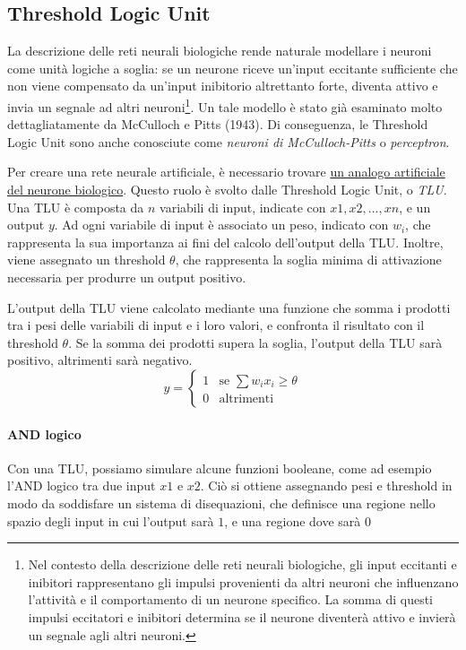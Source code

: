 \subsection{Threshold Logic Unit}
La descrizione delle reti neurali biologiche rende naturale modellare i neuroni come unità logiche a soglia: se un neurone riceve un'input eccitante sufficiente che non viene compensato da un'input inibitorio altrettanto forte, diventa attivo e invia un segnale ad altri neuroni\footnote{Nel contesto della descrizione delle reti neurali biologiche, gli input eccitanti e inibitori rappresentano gli impulsi provenienti da altri neuroni che influenzano l'attività e il comportamento di un neurone specifico. La somma di questi impulsi eccitatori e inibitori determina se il neurone diventerà attivo e invierà un segnale agli altri neuroni.}. Un tale modello è stato già esaminato molto dettagliatamente da McCulloch e Pitts (1943). Di conseguenza, le Threshold Logic Unit sono anche conosciute come \textit{neuroni di McCulloch-Pitts} o \textit{perceptron}.

Per creare una rete neurale artificiale, è necessario trovare \uline{un analogo artificiale del neurone biologico}. Questo ruolo è svolto dalle Threshold Logic Unit, o \textit{TLU}. Una TLU è composta da $n$ variabili di input, indicate con $x1, x2, ..., xn$, e un output $y$. Ad ogni variabile di input è associato un peso, indicato con $w_i$, che rappresenta la sua importanza ai fini del calcolo dell'output della TLU. Inoltre, viene assegnato un threshold $\theta$, che rappresenta la soglia minima di attivazione necessaria per produrre un output positivo.

L'output della TLU viene calcolato mediante una funzione che somma i prodotti tra i pesi delle variabili di input e i loro valori, e confronta il risultato con il threshold $\theta$. Se la somma dei prodotti supera la soglia, l'output della TLU sarà positivo, altrimenti sarà negativo.
$$
y=\begin{cases}
    1 & \text{se } \sum w_ix_i \geq \theta \\
    0 & \text{altrimenti} 
   \end{cases}
$$

\paragraph{AND logico}
Con una TLU, possiamo simulare alcune funzioni booleane, come ad esempio l'AND logico tra due input $x1$ e $x2$. Ciò si ottiene assegnando pesi e threshold in modo da soddisfare un sistema di disequazioni, che definisce una regione nello spazio degli input in cui l'output sarà $1$, e una regione dove sarà $0$

